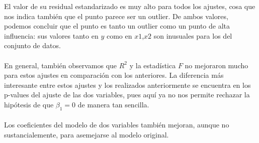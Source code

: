 \documentclass[11pt]{article}
\begin{document}
El valor de su residual estandarizado es muy alto para todos los ajustes, cosa que nos indica también que el punto parece ser un outlier. De ambos valores, podemos concluir que el punto es tanto un outlier como un punto de alta influencia: sus valores tanto en $y$ como en $x1$,$x2$ son inusuales para los del conjunto de datos.
\\
\\En general, también observamos que $R^2$ y la estadística $F$ no mejoraron mucho para estos ajustes en comparación con los anteriores. La diferencia más interesante entre estos ajustes y los realizados anteriormente se encuentra en los p-values del ajuste de las dos variables, pues aquí ya no nos permite rechazar la hipótesis de que $\beta_1 = 0$ de manera tan sencilla.
\\
\\Los coeficientes del modelo de dos variables también mejoran, aunque no sustancialemente, para asemejarse al modelo original.
\end{document}
